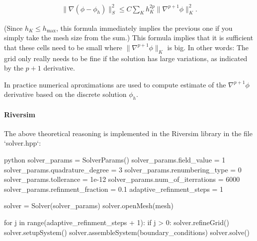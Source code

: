 \documentclass[]{pracamgr}
\begin{document}
        \begin{align*}
          \|\nabla(\phi-\phi_h)\|_{S}^2 \le C \sum_K h_K^{2p} \| \nabla^{p+1} \phi \|^2_K.
        \end{align*}

        (Since $h_K\le h_\text{max}$, this formula immediately implies the previous one if you simply take the mesh size from the sum.) This formula implies that it is sufficient that these cells need to be small where $\| \nabla^{p+1} \phi \|_K$ is big. In other words: The grid only really needs to be fine if the solution has large variations, as indicated by the $p+1$ derivative.
        
        In practice numerical aproximations are used to compute estimate of the $\nabla^{p+1} \phi$ derivative based on the discrete solution $\phi_h$.

      \paragraph{Riversim}
        
        The above theoretical reasoning is implemented in the Riversim library in the file `solver.hpp`:
        
        \begin{mintedbox}{python}
          solver_params = SolverParams()
          solver_params.field_value = 1
          solver_params.quadrature_degree = 3
          solver_params.renumbering_type = 0
          solver_params.tollerance = 1e-12
          solver_params.num_of_iterrations =  6000
          solver_params.refinment_fraction = 0.1
          adaptive_refinment_steps = 1
        
          solver = Solver(solver_params)
          solver.openMesh(mesh)
          
          for j in range(adaptive_refinment_steps + 1):
              if j > 0:
                  solver.refineGrid()
              solver.setupSystem()
              solver.assembleSystem(boundary_conditions)
              solver.solve()\end{mintedbox}
\end{document}
